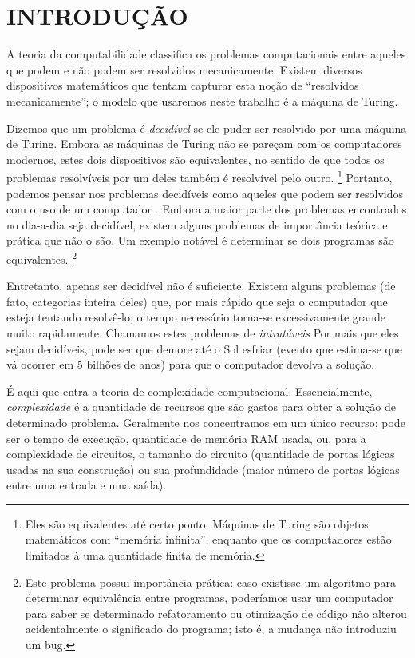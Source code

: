 \chapter{INTRODUÇÃO}

A teoria da computabilidade
classifica os problemas computacionais entre
aqueles que podem e não podem ser resolvidos mecanicamente.
Existem diversos dispositivos matemáticos
que tentam capturar esta noção de
``resolvidos mecanicamente'';
o modelo que usaremos neste trabalho é a máquina de Turing.

Dizemos que um problema é \emph{decidível}
se ele puder ser resolvido por uma máquina de Turing.
Embora as máquinas de Turing
não se pareçam com os computadores modernos,
estes dois dispositivos são equivalentes,
no sentido de que
todos os problemas resolvíveis por um deles
também é resolvível pelo outro.
\footnote{
    Eles são equivalentes até certo ponto.
    Máquinas de Turing são objetos matemáticos
    com ``memória infinita'',
    enquanto que os computadores estão limitados
    à uma quantidade finita de memória.
}
Portanto, podemos pensar nos problemas decidíveis
como aqueles que podem ser resolvidos com o uso de um computador
\cite[p. 307]{HopcroftMotwaniUllman2001}.
Embora a maior parte dos problemas
encontrados no dia-a-dia seja decidível,
existem alguns problemas de importância teórica e prática
que não o são.
Um exemplo notável é determinar se dois programas são equivalentes.
\footnote{
    Este problema possui importância prática:
    caso existisse um algoritmo para determinar equivalência entre programas,
    poderíamos usar um computador para saber se
    determinado refatoramento ou otimização de código
    não alterou acidentalmente o significado do programa;
    isto é, a mudança não introduziu um bug.
}

Entretanto,
apenas ser decidível não é suficiente.
Existem alguns problemas
(de fato, categorias inteira deles)
que, por mais rápido que seja o computador
que esteja tentando resolvê-lo,
o tempo necessário torna-se excessivamente grande
muito rapidamente.
Chamamos estes problemas de \emph{intratáveis}
\cite[p. 1]{HopcroftMotwaniUllman2001}
Por mais que eles sejam decidíveis,
pode ser que demore até o Sol esfriar
(evento que estima-se que vá ocorrer em 5 bilhões de anos)
para que o computador devolva a solução.

É aqui que entra a teoria de complexidade computacional.
Essencialmente,
\emph{complexidade}
é a quantidade de recursos que são gastos
para obter a solução de determinado problema.
Geralmente nos concentramos em um único recurso;
pode ser o tempo de execução,
quantidade de memória RAM usada,
ou,
para a complexidade de circuitos,
o tamanho do circuito
(quantidade de portas lógicas usadas na sua construção)
ou sua profundidade
(maior número de portas lógicas entre uma entrada e uma saída).

